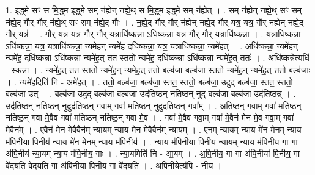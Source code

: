 \documentclass[17pt]{extarticle}
\begin{document}
1. इ॒द्ध्मे सꣳ स मि॒द्ध्म इ॒द्ध्मे सम् न॑ह्येन् नह्ये॒थ् स मि॒द्ध्म इ॒द्ध्मे सम् न॑ह्येत् । . सम् न॑ह्येन् नह्ये॒थ् सꣳ सम् न॑ह्ये॒द् गौर् गौर् न॑ह्ये॒थ् सꣳ सम् न॑ह्ये॒द् गौः । . न॒ह्ये॒द् गौर् गौर् न॑ह्येन् नह्ये॒द् गौर् यत्र॒ यत्र॒ गौर् न॑ह्येन् नह्ये॒द् गौर् यत्र॑ । . गौर् यत्र॒ यत्र॒ गौर् गौर् यत्राधि॑ष्क॒न्ना ऽधि॑ष्कन्ना॒ यत्र॒ गौर् गौर् यत्राधि॑ष्कन्ना । . यत्राधि॑ष्क॒न्ना ऽधि॑ष्कन्ना॒ यत्र॒ यत्राधि॑ष्कन्ना॒ न्यमे॑ह॒न् न्यमे॑ह॒ दधि॑ष्कन्ना॒ यत्र॒ यत्राधि॑ष्कन्ना॒ न्यमे॑हत् । . अधि॑ष्कन्ना॒ न्यमे॑ह॒न् न्यमे॑ह॒ दधि॑ष्क॒न्ना ऽधि॑ष्कन्ना॒ न्यमे॑ह॒त् तत॒ स्ततो॒ न्यमे॑ह॒ दधि॑ष्क॒न्ना ऽधि॑ष्कन्ना॒ न्यमे॑ह॒त् ततः॑ । . अधि॑ष्क॒न्नेत्यधि॑ - स्क॒न्ना॒ । . न्यमे॑ह॒त् तत॒ स्ततो॒ न्यमे॑ह॒न् न्यमे॑ह॒त् ततो॒ बल्ब॑जा॒ बल्ब॑जा॒ स्ततो॒ न्यमे॑ह॒न् न्यमे॑ह॒त् ततो॒ बल्ब॑जाः । . न्यमे॑ह॒दिति॑ नि - अमे॑हत् । . ततो॒ बल्ब॑जा॒ बल्ब॑जा॒ स्तत॒ स्ततो॒ बल्ब॑जा॒ उदुद् बल्ब॑जा॒ स्तत॒ स्ततो॒ बल्ब॑जा॒ उत् । . बल्ब॑जा॒ उदुद् बल्ब॑जा॒ बल्ब॑जा॒ उद॑तिष्ठन् नतिष्ठ॒न् नुद् बल्ब॑जा॒ बल्ब॑जा॒ उद॑तिष्ठन्न् । . उद॑तिष्ठन् नतिष्ठ॒न् नुदुद॑तिष्ठ॒न् गवा॒म् गवा॑ मतिष्ठ॒न् नुदुद॑तिष्ठ॒न् गवा᳚म् । . अ॒ति॒ष्ठ॒न् गवा॒म् गवा॑ मतिष्ठन् नतिष्ठ॒न् गवा॑ मे॒वैव गवा॑ मतिष्ठन् नतिष्ठ॒न् गवा॑ मे॒व । . गवा॑ मे॒वैव गवा॒म् गवा॑ मे॒वैन॑ मेन मे॒व गवा॒म् गवा॑ मे॒वैन᳚म् । . ए॒वैन॑ मेन मे॒वैवैन॑म् न्या॒यम् न्या॒य मे॑न मे॒वैवैन॑म् न्या॒यम् । . ए॒न॒म् न्या॒यम् न्या॒य मे॑न मेनम् न्या॒य म॑पि॒नीया॑ पि॒नीय॑ न्या॒य मे॑न मेनम् न्या॒य म॑पि॒नीय॑ । . न्या॒य म॑पि॒नीया॑ पि॒नीय॑ न्या॒यम् न्या॒य म॑पि॒नीय॒ गा गा अ॑पि॒नीय॑ न्या॒यम् न्या॒य म॑पि॒नीय॒ गाः । . न्या॒यमिति॑ नि - आ॒यम् । . अ॒पि॒नीय॒ गा गा अ॑पि॒नीया॑ पि॒नीय॒ गा वे॑दयति वेदयति॒ गा अ॑पि॒नीया॑ पि॒नीय॒ गा वे॑दयति । . अ॒पि॒नीयेत्य॑पि - नीय॑ । \newline
\end{document}
